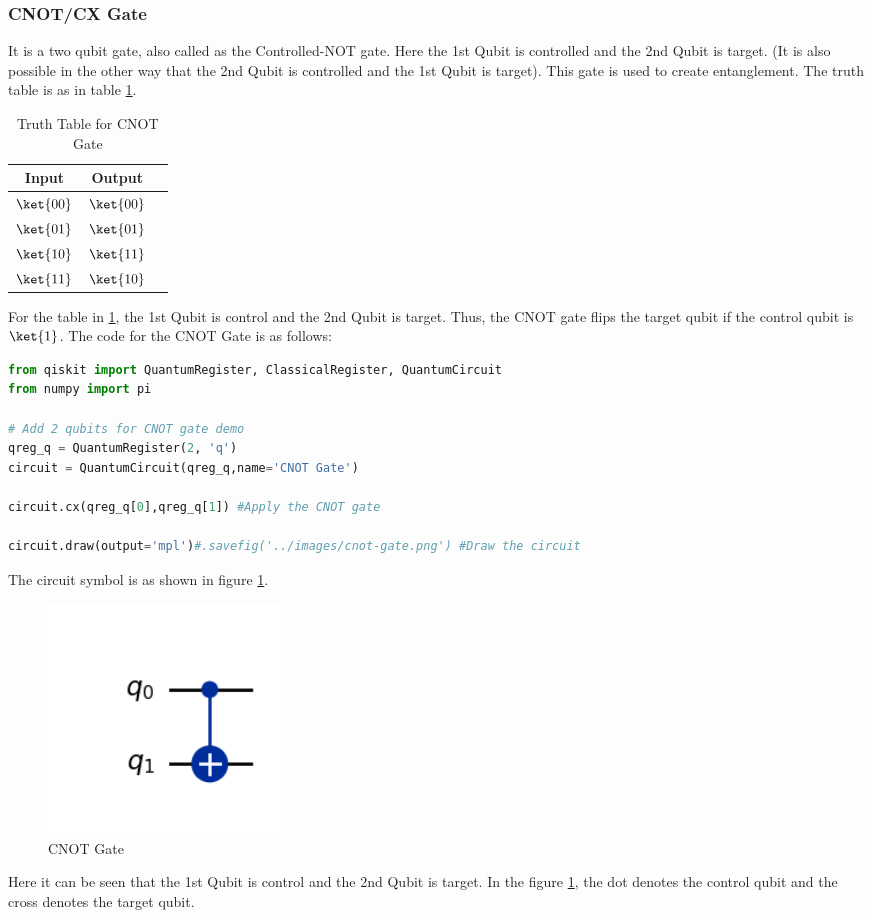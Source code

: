 \documentclass[12pt, oneside]{book}
\theoremstyle{definition}
\theoremstyle{definition}
\theoremstyle{remark}
\begin{document}
\subsubsection{CNOT/CX Gate}
It is a two qubit gate, also called as the Controlled-NOT gate.
Here the 1st Qubit is controlled and the 2nd Qubit is target.
(It is also possible in the other way that the 2nd Qubit is controlled and the 1st Qubit is target).
This gate is used to create entanglement.
The truth table is as in table \ref{tab:cnot}.
\begin{table}[H]
    \centering
    \begin{tabular}{|c|c|c|}
        \hline
        Input & Output\\
        \hline
        $\ket{00}$ & $\ket{00}$\\
        $\ket{01}$   & $\ket{01}$\\
        $\ket{10}$   & $\ket{11}$\\
        $\ket{11}$  & $\ket{10}$\\
        \hline
    \end{tabular}
    \caption{Truth Table for CNOT Gate}
    \label{tab:cnot}
\end{table}
For the table in \ref{tab:cnot}, the 1st Qubit is control and the 2nd Qubit is target.
Thus, the CNOT gate flips the target qubit if the control qubit is $\ket{1}$.
The code for the CNOT Gate is as follows:
\begin{lstlisting}[language=Python]
from qiskit import QuantumRegister, ClassicalRegister, QuantumCircuit
from numpy import pi

# Add 2 qubits for CNOT gate demo
qreg_q = QuantumRegister(2, 'q')
circuit = QuantumCircuit(qreg_q,name='CNOT Gate')

circuit.cx(qreg_q[0],qreg_q[1]) #Apply the CNOT gate

circuit.draw(output='mpl')#.savefig('../images/cnot-gate.png') #Draw the circuit
\end{lstlisting}

The circuit symbol is as shown in figure \ref{fig:cnot}.
\begin{figure}[H]
    \centering
    \includegraphics[width=0.3\textwidth]{../images/cnot-gate.png}
    \caption{CNOT Gate}
    \label{fig:cnot}
\end{figure}
Here it can be seen that the 1st Qubit is control and the 2nd Qubit is target. In the
figure \ref{fig:cnot}, the dot denotes the control qubit and the cross denotes the target qubit.
\end{document}
